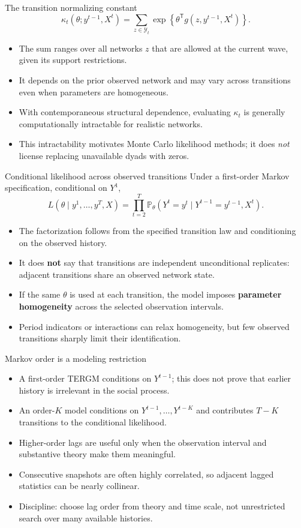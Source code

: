 \documentclass[aspectratio=169,11pt]{beamer}
\newcommand{\Prb}{\mathbb{P}}
\newcommand{\term}[1]{\textbf{\color{nupurple}#1}}
\begin{document}
\begin{frame}{The transition normalizing constant}
\[
\kappa_t(\theta;y^{t-1},X^t)
=
\sum_{z\in\mathcal{Y}_t}
\exp\!\left\{\theta^{\mathsf T}g(z,y^{t-1},X^t)\right\}.
\]
\begin{itemize}
\item The sum ranges over all networks $z$ that are allowed at the current wave, given its support restrictions.
\item It depends on the prior observed network and may vary across transitions even when parameters are homogeneous.
\item With contemporaneous structural dependence, evaluating $\kappa_t$ is generally computationally intractable for realistic networks.
\item This intractability motivates Monte Carlo likelihood methods; it does \emph{not} license replacing unavailable dyads with zeros.
\end{itemize}
\end{frame}

\begin{frame}{Conditional likelihood across observed transitions}
Under a first-order Markov specification, conditional on $Y^1$,
\[
L(\theta\mid y^1,\ldots,y^T,X)
=
\prod_{t=2}^{T}
\Prb_{\theta}\!\left(Y^t=y^t\mid Y^{t-1}=y^{t-1},X^t\right).
\]
\begin{itemize}
\item The factorization follows from the specified transition law and conditioning on the observed history.
\item It does \term{not} say that transitions are independent unconditional replicates: adjacent transitions share an observed network state.
\item If the same $\theta$ is used at each transition, the model imposes \term{parameter homogeneity} across the selected observation intervals.
\item Period indicators or interactions can relax homogeneity, but few observed transitions sharply limit their identification.
\end{itemize}
\end{frame}

\begin{frame}{Markov order is a modeling restriction}
\begin{itemize}
\item A first-order TERGM conditions on $Y^{t-1}$; this does not prove that earlier history is irrelevant in the social process.
\item An order-$K$ model conditions on $Y^{t-1},\ldots,Y^{t-K}$ and contributes $T-K$ transitions to the conditional likelihood.
\item Higher-order lags are useful only when the observation interval and substantive theory make them meaningful.
\item Consecutive snapshots are often highly correlated, so adjacent lagged statistics can be nearly collinear.
\item \alert{Discipline:} choose lag order from theory and time scale, not unrestricted search over many available histories.
\end{itemize}
\end{frame}
\end{document}
